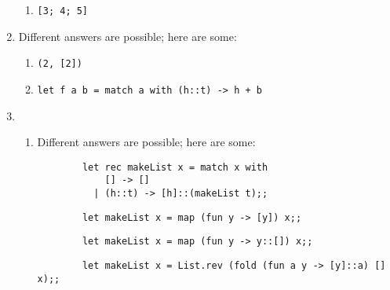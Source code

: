 \documentclass[11pt]{article}
\begin{document}
\begin{enumerate}
\begin{enumerate}
            \item \texttt{[3; 4; 5]}

          \end{enumerate}

          \vspace{-2.5mm}

    \item Different answers are possible; here are some:

          \begin{enumerate}

            \addtolength{\itemsep}{0mm}

            \item \texttt{(2, [2])}

            \item \texttt{let f a b = match a with (h::t) -> h + b}

          \end{enumerate}

          \vspace{-2.5mm}

    \item \vspace{-2.5mm}

          \begin{enumerate}

            \addtolength{\itemsep}{4mm}

            \item Different answers are possible; here are some:

                  \begin{Verbatim}
        let rec makeList x = match x with
            [] -> []
          | (h::t) -> [h]::(makeList t);;
                  \end{Verbatim}

                  \medskip

                  \begin{Verbatim}
        let makeList x = map (fun y -> [y]) x;;
                  \end{Verbatim}

                  \medskip

                  \begin{Verbatim}
        let makeList x = map (fun y -> y::[]) x;;
                  \end{Verbatim}

                  \medskip

                  \begin{Verbatim}
        let makeList x = List.rev (fold (fun a y -> [y]::a) [] x);;
                  \end{Verbatim}


\end{enumerate}
\end{enumerate}
\end{document}
